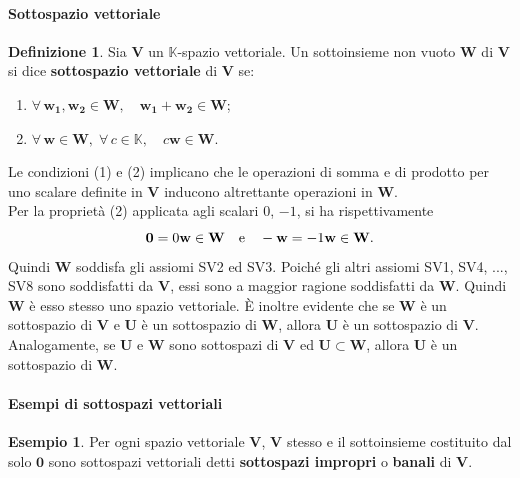 \documentclass{article}
\theoremstyle{plain}
\theoremstyle{definition}
\newtheorem{defn}{Definizione}[section]
\newtheorem{exmp}{Esempio}[section]
\theoremstyle{remark}
\begin{document}
\paragraph{Sottospazio vettoriale}
\begin{bxthm}
\begin{defn}
    Sia \( \mathbf{V} \) un $\mathbb{K}$-spazio vettoriale.
    Un sottoinsieme non vuoto \( \mathbf{W} \) di \( \mathbf{V} \) si dice \textbf{sottospazio vettoriale} di \( \mathbf{V} \) se:
    \begin{enumerate}
    \item \( \forall\,\mathbf{w_1}, \mathbf{w_2} \in \mathbf{W},\quad  \mathbf{w_1} + \mathbf{w_2} \in \mathbf{W} \);
    \item \( \forall\, \mathbf{w} \in \mathbf{W},\; \forall\, c \in \mathbb{K},\quad c\mathbf{w} \in \mathbf{W} \).
    \end{enumerate}
\end{defn}
\end{bxthm}

\vspace{10pt}

Le condizioni (1) e (2) implicano che le operazioni di somma e di prodotto per uno scalare definite in \( \mathbf{V} \) inducono altrettante operazioni in \( \mathbf{W} \). \\
Per la proprietà (2) applicata agli scalari \( 0 \), \( -1 \), si ha rispettivamente 
\[ \mathbf{0} = 0\mathbf{w} \in \mathbf{W} \quad\textup{e}\quad -\mathbf{w} = -1\mathbf{w}\in \mathbf{W} .\]
Quindi \( \mathbf{W} \) soddisfa gli assiomi SV2 ed SV3.
Poiché gli altri assiomi SV1, SV4, ..., SV8 sono soddisfatti da \( \mathbf{V} \), essi sono a maggior ragione soddisfatti da \( \mathbf{W} \). 
Quindi \( \mathbf{W} \) è esso stesso uno spazio vettoriale.
È inoltre evidente che se \( \mathbf{W} \) è un sottospazio di \( \mathbf{V} \) e \( \mathbf{U} \) è un sottospazio di \( \mathbf{W} \), allora \( \mathbf{U} \) è un sottospazio di \( \mathbf{V} \). 
Analogamente, se \( \mathbf{U} \) e \( \mathbf{W} \) sono sottospazi di \( \mathbf{V} \) ed \( \mathbf{U} \subset \mathbf{W} \), allora \( \mathbf{U} \) è un sottospazio di \( \mathbf{W} \).\\

\vspace{10pt}

\paragraph{Esempi di sottospazi vettoriali}
\begin{exmp}
    Per ogni spazio vettoriale \( \mathbf{V} \), \( \mathbf{V} \) stesso e il sottoinsieme costituito dal solo \( \mathbf{0} \) sono 
    sottospazi vettoriali detti \textbf{sottospazi impropri} o \textbf{banali} di \( \mathbf{V} \).
\end{exmp}
\end{document}
